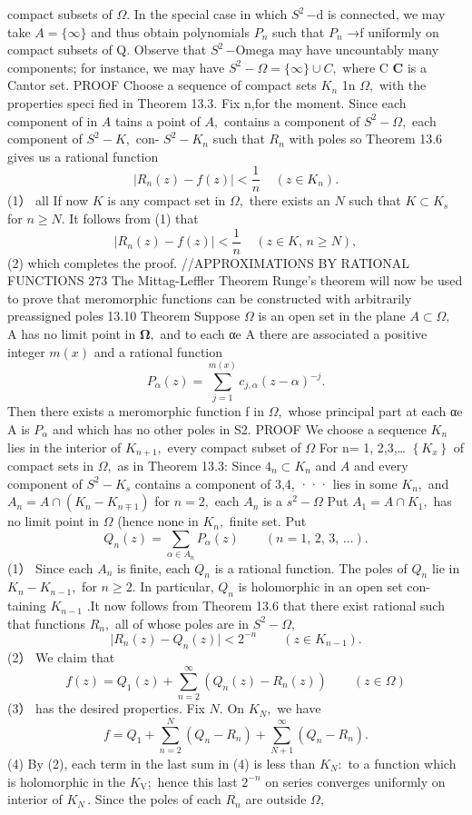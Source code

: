 compact subsets of $\Omega.$ In the special case in which $\scriptstyle S^{2}\,{\mathrm{-d}}$ is connected, we may take $A=\{\infty\}$ and thus obtain polynomials $P_{n}$ such that $P_{n}$ →f uniformly on compact subsets of Q. Observe that $\scriptstyle S^{2}\,{\mathrm{-Omega}}$ may have uncountably many components; for instance, we may have $S^{2}-\Omega=\{\infty\}\cup C,$ where C ${\boldsymbol{C}}$ is a Cantor set. PROOF Choose a sequence of compact sets $K_{n}$ 1n $\Omega,$ with the properties speci fied in Theorem 13.3. Fix n,for the moment. Since each component of in $\scriptstyle A$ tains a point of $A,$ contains a component of $S^{2}-\Omega,$ each component of $S^{2}-K,$ con- $S^{2}-K_{n}$ such that $R_{n}$ with poles so Theorem 13.6 gives us a rational function $$ |R_{n}(z)-f(z)|<\frac{1}{n}~~~~~(z\in K_{n}). $$ (1） all If now $\textstyle K$ is any compact set in $\Omega,$ there exists an ${\mathbf{}}N$ such that $K\subset K_{s}$ for $n\geq N.$ It follows from (1) that $$ \vert R_{n}(z)-f(z)\vert<\frac{1}{n}~~~~~(z\in K,\,n\geq N), $$ (2) which completes the proof. //APPROXIMATIONS BY RATIONAL FUNCTIONS $273$ The Mittag-Leffler Theorem Runge's theorem will now be used to prove that meromorphic functions can be constructed with arbitrarily preassigned poles 13.10 Theorem Suppose $\Omega$ is an open set in the plane $A\subset\Omega,$ A has no limit point in ${\boldsymbol{\Omega}},$ and to each αe A there are associated a positive integer $\scriptstyle m(x)$ and a rational function $$ P_{\alpha}(z)=\sum_{j=1}^{m(x)}c_{j,\alpha}(z-\alpha)^{-j}. $$ Then there exists a meromorphic function f in $\Omega,$ whose principal part at each αe A is $P_{\alpha}$ and which has no other poles in S2. PROOF We choose a sequence $K_{n}$ lies in the interior of $K_{n+1},$ every compact subset of $\Omega$ For n= 1, 2,3,… $\left\{K_{x}\right\}$ of compact sets in $\Omega,$ as in Theorem 13.3: Since $4_{n}\subset K_{n}$ and $\scriptstyle A$ and every component of $S^{2}-K_{s}$ contains a component of 3,4, ··· lies in some $K_{n},$ and $A_{n}=A\cap(K_{n}-K_{n\mp1})$ for $\textstyle n=2,$ each $A_{n}$ is a $s^{2}-\Omega$ Put $A_{1}=A\cap K_{1},$ has no limit point in $\Omega$ (hence none in $K_{n},$ finite set. Put $$ Q_{n}(z)=\sum_{\alpha\in A_{n}}P_{\alpha}(z)\qquad(n=1,\,2,\,3,\,\ldots). $$ (1） Since each $A_{n}$ is finite, each $Q_{n}$ is a rational function. The poles of $Q_{n}$ lie in $K_{n}-K_{n-1},$ for $n\geq2.$ In particular, $Q_{n}$ is holomorphic in an open set con- taining $K_{n-1}$ .It now follows from Theorem 13.6 that there exist rational such that functions $R_{n},$ all of whose poles are in $S^{2}-\Omega,$ $$ \vert R_{n}(z)-Q_{n}(z)\vert<2^{-n}\qquad\left(z\in K_{n-1}\right). $$ (2） We claim that $$ f(z)=Q_{1}(z)+\sum_{n=2}^{\infty}(Q_{n}(z)-R_{n}(z))\qquad(z\in\Omega) $$ (3） has the desired properties. Fix $N.$ On $K_{N},$ we have $$ f=Q_{1}+\sum_{n=2}^{N}\left(Q_{n}-R_{n}\right)+\sum_{N+1}^{\infty}\left(Q_{n}-R_{n}\right). $$ (4) By (2), each term in the last sum in (4) is less than $K_{N}{\mathrm{:}}$ to a function which is holomorphic in the $K_{\mathrm{{V}}};$ hence this last $2^{-n}$ on series converges uniformly on interior of $K_{N}\,.$ Since the poles of each $R_{n}$ are outside $\Omega,$ $$ 